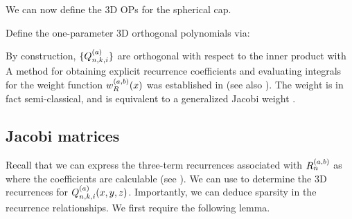 We can now define the 3D OPs for the spherical cap.
\begin{definition}\label{def:sc:OPconstruction}
	Define the one-parameter 3D orthogonal polynomials via:
\end{definition}

By construction, $\{Q_{n,k,i}^{(a)}\}$ are orthogonal with respect to the inner product
with
A method for obtaining explicit recurrence coefficients and evaluating integrals for the weight function $w_R^{(a,b)}(x)$ was established in  (see also \cite{snowball2019sparse}). The weight is in fact semi-classical, and is equivalent to a generalized Jacobi weight \cite[\S5]{magnus1995painleve}.


\subsection{Jacobi matrices}\label{section:sc:jacobimats}

Recall that we can express the three-term recurrences associated with $R_n^{(a,b)}$ as
where the coefficients are calculable (see ). We can use  to determine the 3D recurrences for $Q_{n,k,i}^{(a)}(x,y,z)$. Importantly, we can deduce sparsity in the recurrence relationships.  We first require the following lemma.

